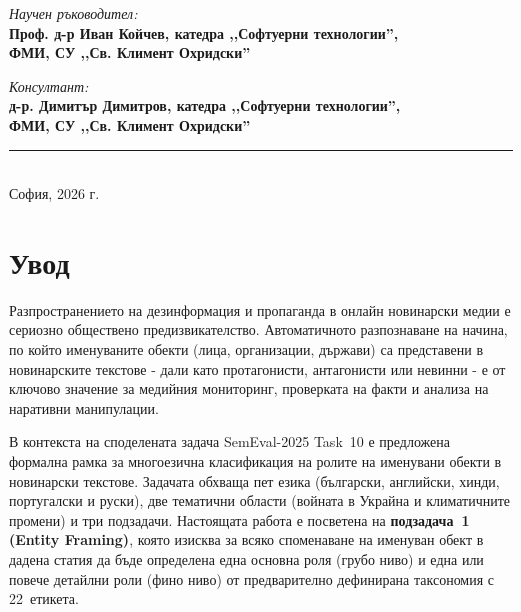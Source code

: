 \documentclass[12pt,a4paper]{report}
\begin{document}
\begin{titlepage}
\begin{center}
\begin{flushright}
\textit{Научен ръководител:}\\[6pt]
\textbf{Проф. д-р Иван Койчев, катедра ,,Софтуерни технологии'',}\\
\textbf{ФМИ, СУ ,,Св. Климент Охридски''}

\vspace{0.8cm}

\textit{Консултант:}\\[6pt]
\textbf{д-р. Димитър Димитров, катедра ,,Софтуерни технологии'',}\\
\textbf{ФМИ, СУ ,,Св. Климент Охридски''}
\end{flushright}

\vfill

\rule{\textwidth}{0.5pt}\\[8pt]
{\large София, 2026 г.}

\end{center}
\end{titlepage}

\tableofcontents
\newpage


\chapter{Увод}

Разпространението на дезинформация и пропаганда в онлайн новинарски медии е сериозно обществено предизвикателство. Автоматичното разпознаване на начина, по който именуваните обекти (лица, организации, държави) са представени в новинарските текстове - дали като протагонисти, антагонисти или невинни - е от ключово значение за медийния мониторинг, проверката на факти и анализа на наративни манипулации.

В контекста на споделената задача SemEval-2025 Task~10 \cite{piskorski2025semeval} е предложена формална рамка за многоезична класификация на ролите на именувани обекти в новинарски текстове. Задачата обхваща пет езика (български, английски, хинди, португалски и руски), две тематични области (войната в Украйна и климатичните промени) и три подзадачи. Настоящата работа е посветена на \textbf{подзадача~1 (Entity Framing)}, която изисква за всяко споменаване на именуван обект в дадена статия да бъде определена една основна роля (грубо ниво) и една или повече детайлни роли (фино ниво) от предварително дефинирана таксономия с 22~етикета.
\end{document}
